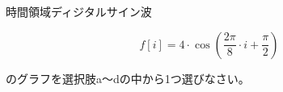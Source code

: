 時間領域ディジタルサイン波 

\[
f[i] = 4 \cdot \cos \left ( \frac{2 \pi}{8}  \cdot i + \frac{\pi}{2} \right )
\]

\noindent のグラフを選択肢a〜dの中から1つ選びなさい。
